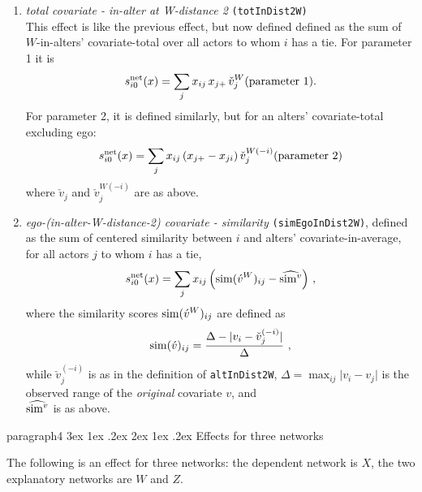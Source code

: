 \documentclass[a4paper,fleqn,11pt]{article}
\makeatletter
\renewcommand\paragraph{\@startsection
   {paragraph}{4}{\z@}               %
   {3ex \@plus1ex \@minus.2ex}       %
   {2ex \@plus1ex \@minus.2ex}       %
   {\normalfont\normalsize\bfseries\itshape}}   %
\newcommand{\+}{\, + \,}
\newcommand{\vit}{\theenumi}
\newcounter{savenumi}
\makeatother
\begin{document}
\begin{enumerate}
\item \emph{total covariate - in-alter at W-distance 2} \texttt{(totInDist2W)} \\
      This effect is like the previous effect, but now defined
      defined as the sum of $W$-in-alters' covariate-total over all actors
      to whom $i$ has a tie. For parameter 1 it is
\[
 s^{\rm net}_{i\vit}(x) = \sum_j x_{ij}\, x_{j+} \, \check v_j^W \hfill (\text{parameter 1}). \hfill
\]
      For parameter 2, it is defined similarly,
      but for an alters' covariate-total excluding
      ego:
\[
 s^{\rm net}_{i\vit}(x) = \sum_j x_{ij} \, (x_{j+}  - x_{ji}) \,
               \check v_j^{W(-i)} \hfill (\text{parameter 2}) \hfill
\]
      where $ \check v_j$ and $ \check v_j^{W(-i)}$ are as above.

\item \emph{ego-(in-alter-W-distance-2) covariate - similarity} \texttt{(simEgoInDist2W)},
      defined as the sum of centered similarity  between $i$
      and alters' covariate-in-average, for all actors
      $j$ to whom $i$ has a tie,
\[
 s^{\rm net}_{i\vit}(x) = \sum_j x_{ij}\, \Big({\rm sim}(\acute v^W)_{ij}
  - \widehat{{\rm sim}^v}\Big) \ ,
\]
 where the similarity scores ${\rm sim}(\acute v^W)_{ij}$ are defined as
\[
{\rm sim}(\acute v)_{ij}=
 \frac{\Delta-\vert  v_i - \check v_j^{(-i)} \vert}{\Delta} \ ,
\]
 while
 $ \check v_j^{(-i)}$ is as in the definition of \texttt{altInDist2W},
 $\Delta=\max_{ij}\vert v_i - v_j \vert$ is the observed range of the
 \emph{original} covariate $v$, and\\
 $\widehat{{\rm sim}^v}$ is as above.

\setcounter{savenumi}{\value{enumi}}
\end{enumerate}


\paragraph{Effects for three networks}

The following is an effect for three networks:
the dependent network is $X$, the two explanatory networks are $W$ and $Z$.
\end{document}
